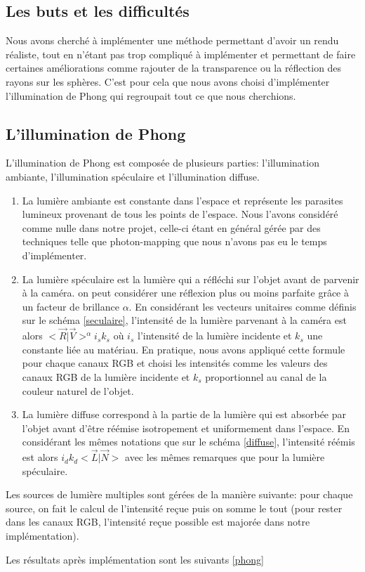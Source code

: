 \subsection{Les buts et les difficultés}
Nous avons cherché à implémenter une méthode permettant d'avoir un rendu réaliste, tout en n'étant pas trop compliqué à implémenter et permettant de faire certaines améliorations comme rajouter de la transparence ou la réflection des rayons sur les sphères. C'est pour cela que nous avons choisi d'implémenter l'illumination de Phong qui regroupait tout ce que nous cherchions.

\subsection{L'illumination de Phong}

L'illumination de Phong est composée de plusieurs parties: l'illumination ambiante, l'illumination spéculaire et l'illumination diffuse.
\begin{enumerate}
\item La lumière ambiante est constante dans l'espace et représente les parasites lumineux provenant de tous les points de l'espace. Nous l'avons considéré comme nulle dans notre projet, celle-ci étant en général gérée par des techniques telle que photon-mapping que nous n'avons pas eu le temps d'implémenter.
\item La lumière spéculaire est la lumière qui a réfléchi sur l'objet avant de parvenir à la caméra. on peut considérer une réflexion plus ou moins parfaite grâce à un facteur de brillance $\alpha$. En considérant les vecteurs unitaires comme définis sur le schéma \ref{seculaire}, l'intensité de la lumière parvenant à la caméra est alors $<\vec{R}|\vec{V}>^{\alpha} i_{s} k_{s}$ où $i_{s}$ l'intensité de la lumière incidente et $k_{s}$ une constante liée au matériau. En pratique, nous avons appliqué cette formule pour chaque canaux RGB et choisi les intensités comme les valeurs des canaux RGB de la lumière incidente et $k_{s}$ proportionnel au canal de la couleur naturel de l'objet.
\item La lumière diffuse correspond à la partie de la lumière qui est absorbée par l'objet avant d'être réémise isotropement et uniformement dans l'espace. En considérant les mêmes notations que sur le schéma \ref{diffuse}, l'intensité réémis est alors $i_{d}k_{d}<\vec{L}|\vec{N}>$ avec les mêmes remarques que pour la lumière spéculaire.
\end{enumerate}

Les sources de lumière multiples sont gérées de la manière suivante: pour chaque source, on fait le calcul de l'intensité reçue puis on somme le tout (pour rester dans les canaux RGB, l'intensité reçue possible est majorée dans notre implémentation).

Les résultats après implémentation sont les suivants \ref{phong}